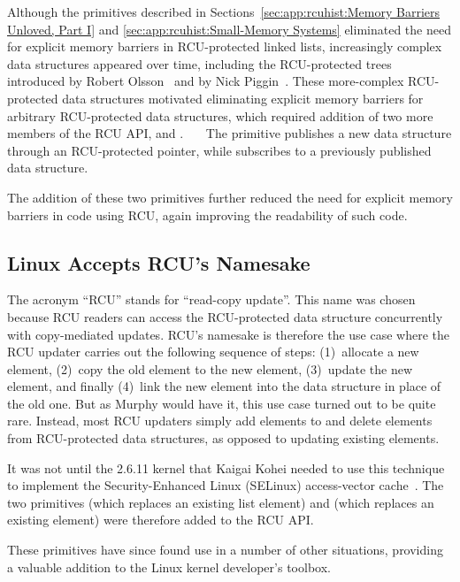 Although the primitives described in
Sections~\ref{sec:app:rcuhist:Memory Barriers Unloved, Part I}
and \ref{sec:app:rcuhist:Small-Memory Systems} eliminated the need for explicit
memory barriers in RCU-protected linked lists,
increasingly complex data structures appeared over time,
including the RCU-protected trees introduced
by Robert Olsson~\cite{RobertOlsson2006a} and by
Nick Piggin~\cite{NickPiggin2006radixtree}.
These more-complex RCU-protected data structures motivated eliminating
explicit memory barriers for arbitrary
RCU-protected data structures, which required addition of two more members
of the RCU API,  and
.~~~
The  primitive publishes a new data structure
through an RCU-protected pointer, while  subscribes
to a previously published data structure.

The addition of these two primitives further reduced the need for explicit
memory barriers in code using RCU, again improving the readability of
such code.

\subsection{Linux Accepts RCU's Namesake}
\label{sec:app:rcuhist:Linux Accepts RCU's Namesake}

The acronym ``RCU'' stands for ``read-copy update''.
This name was chosen because
RCU readers can access the RCU-protected data structure concurrently with
copy-mediated updates.
RCU's namesake is therefore the use case where the RCU updater carries
out the following sequence of steps:
(1)~allocate a new element,
(2)~copy the old element to the new element,
(3)~update the new element, and finally
(4)~link the new element into the data structure in place of the old one.
But as Murphy would have it, this use case turned out to be quite rare.
Instead, most RCU updaters simply add elements to and delete elements from
RCU-protected data structures, as opposed to updating existing elements.

It was not until the 2.6.11 kernel that Kaigai Kohei needed to use
this technique to implement the Security-Enhanced Linux (SELinux)
access-vector cache~\cite{JamesMorris04b}.
The two primitives  (which replaces an existing list element)
and  (which replaces an existing  element)
were therefore added to the RCU API.

These primitives have since found use in a number of other situations,
providing a valuable addition to the Linux kernel developer's toolbox.

